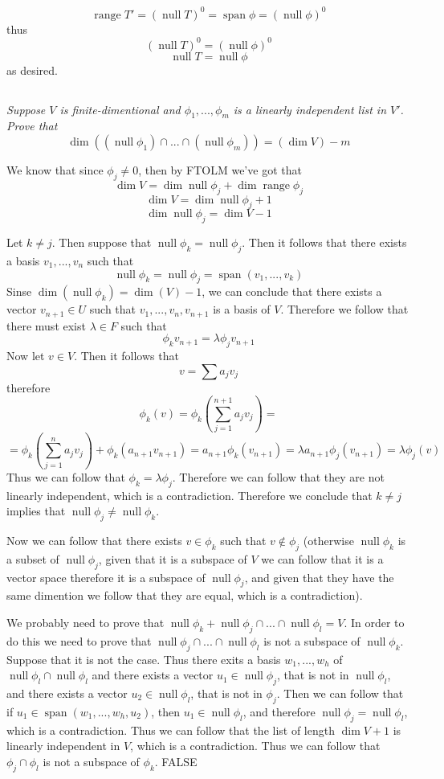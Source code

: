 \documentclass[11pt,oneside,titlepage]{book}
\DeclareMathOperator \ns {null}
\DeclareMathOperator \range {range}
\DeclareMathOperator \Span {span}
\begin{document}
$$\range T' = (\ns T)^0 = \Span \phi = (\ns \phi)^0$$
thus
$$(\ns T)^0 = (\ns \phi)^0$$
$$\ns T = \ns \phi$$
as desired.

\subsection{}

\textit{Suppose $V$ is finite-dimentional and $\phi_1, ..., \phi_m$ is a linearly independent
  list in $V'$. Prove that }
$$\dim ((\ns \phi_1) \cap ... \cap (\ns \phi_m)) = (\dim V) - m$$

We know that since $\phi_j \neq 0$, then by FTOLM we've got that
$$\dim V = \dim \ns \phi_j + \dim \range \phi_j$$
$$\dim V = \dim \ns \phi_j + 1$$
$$\dim \ns \phi_j = \dim V - 1 $$

Let $k \neq j$. Then suppose that  $\ns \phi_k = \ns \phi_j$. Then it follows that
there exists a basis $v_1, ..., v_n$ such that
$$\ns \phi_k = \ns \phi_j = \Span(v_1, ..., v_k)$$
Sinse $\dim(\ns \phi_k) = \dim(V) - 1$, we can conclude that there exists a vector $v_{n + 1} \in U$
such that $v_1, ..., v_n, v_{n + 1}$ is a basis of $V$. Therefore we follow that
there must exist $\lambda \in F$ such that
$$\phi_k v_{n + 1} = \lambda \phi_j v_{n + 1}$$
Now let $v \in V$. Then it follows that
$$v = \sum a_j v_j$$
therefore
$$\phi_k (v) = \phi_k \left(\sum_{j = 1}^{n + 1}{ a_j v_j}\right)  = $$
$$=
\phi_k \left(\sum_{j = 1}^{n}{ a_j v_j}\right) + \phi_k(a_{n + 1} v_{n + 1}) =
a_{n + 1} \phi_k( v_{n + 1}) = \lambda a_{n + 1} \phi_j ( v_{n + 1}) = \lambda \phi_j(v)$$
Thus we can follow that $\phi_k = \lambda \phi_j$. Therefore we can follow that
they are not linearly independent, which is a contradiction. Therefore we conclude
that $k \neq j$ implies that $\ns \phi_j \neq \ns \phi_k$.

Now we can follow that there exists $v \in \phi_k$ such that $v \notin \phi_j$ (otherwise
$\ns \phi_k$ is a subset of $\ns \phi_j$, given that it is a subspace of $V$ we can follow that
it is a vector space therefore it is a subspace of $\ns \phi_j$, and given that
they have the same dimention we follow that they are equal, which is a contradiction).

We probably need to prove that $\ns \phi_k + \ns \phi_j \cap ... \cap \ns \phi_l = V$. In order
to do this we need to prove that $\ns \phi_j \cap ... \cap \ns \phi_l$ is not a subspace of
$\ns \phi_k$. Suppose that it is not the case. Thus there exits a basis $w_1, ..., w_h$ of
$\ns \phi_l \cap \ns \phi_l$ and there exists
a vector $u_1 \in \ns \phi_j$, that is not in $\ns \phi_l$, and there exists a vector
$u_2 \in \ns \phi_l$, that is not in $\phi_j$. Then we can follow that if
$u_1 \in \Span(w_1, ..., w_h, u_2)$, then $u_1 \in \ns \phi_l$, and therefore
$\ns \phi_j = \ns \phi_l$, which is a contradiction. Thus we can follow that
the list of length $\dim V + 1$ is linearly independent in $V$, which is a contradiction.
Thus we can follow that $\phi_j \cap \phi_l$ is not a subspace of $\phi_k$. FALSE
\end{document}
